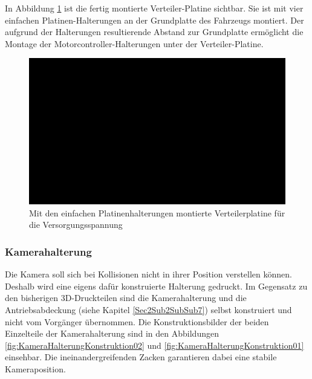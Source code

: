 In Abbildung \ref{fig:PlatinenHalterungenMontage} ist die fertig montierte Verteiler-Platine sichtbar. Sie ist mit vier einfachen Platinen-Halterungen an der Grundplatte des Fahrzeugs montiert. Der aufgrund der Halterungen resultierende Abstand zur Grundplatte ermöglicht die Montage der Motorcontroller-Halterungen unter der Verteiler-Platine.

\begin{figure}[H] %
\includegraphics[width=.70\textwidth]{sec2/images/3DAnbaukomponenten/Montagebilder/PlatinenHalterungenMontage} 
\centering
\captionsetup{width=.8\textwidth}
\caption[Mit den Platinenhalterungen montierte Versorgungsspannungs-Verteilerplatine ]{Mit den einfachen Platinenhalterungen montierte Verteilerplatine für die Versorgungsspannung}
\centering
\label{fig:PlatinenHalterungenMontage}
\end{figure}

\subsubsection{Kamerahalterung}\label{Sec2Sub2SubSub6}

Die Kamera soll sich bei Kollisionen nicht in ihrer Position verstellen können. Deshalb wird eine eigens dafür konstruierte Halterung gedruckt. Im Gegensatz zu den bisherigen 3D-Druckteilen sind die Kamerahalterung und die Antriebsabdeckung (siehe Kapitel \ref{Sec2Sub2SubSub7}) selbst konstruiert und nicht vom Vorgänger übernommen. Die Konstruktionsbilder der beiden Einzelteile der Kamerahalterung sind in den Abbildungen \ref{fig:KameraHalterungKonstruktion02} und \ref{fig:KameraHalterungKonstruktion01} einsehbar. Die ineinandergreifenden Zacken garantieren dabei eine stabile Kameraposition.

